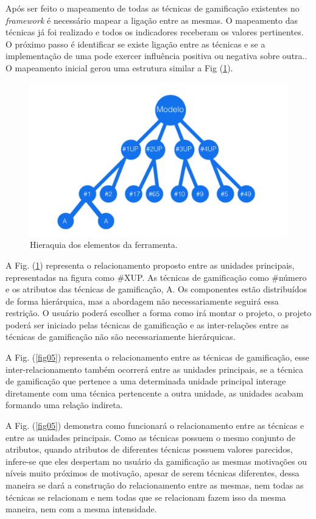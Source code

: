 Após ser feito o mapeamento de todas as técnicas de gamificação existentes no \textit{framework} é necessário mapear a ligação entre as mesmas. O mapeamento das técnicas já foi realizado e todos os indicadores receberam os valores pertinentes. O próximo passo é identificar se existe ligação entre as técnicas  e se a implementação de uma pode exercer influência positiva ou negativa sobre  outra.. O mapeamento inicial gerou uma estrutura similar a Fig (\ref{fig04}).

\begin{figure}[h]
	\centering
		\includegraphics[keepaspectratio=true,scale=0.5]{figuras/hierarquia.png}
	\caption{Hieraquia dos elementos da ferramenta.	\label{fig04}}
\end{figure}

A Fig. (\ref{fig04}) representa o relacionamento proposto entre as unidades principais, representadas na figura como \#XUP. As técnicas de gamificação como \#número e os atributos das técnicas de gamificação, A. Os componentes estão distribuídos de forma hierárquica, mas a abordagem não necessariamente seguirá essa restrição.  O usuário poderá escolher a forma como irá montar o projeto, o projeto poderá ser iniciado pelas técnicas de gamificação e as inter-relações entre as técnicas de gamificação não são necessariamente hierárquicas.

A Fig. (\ref{fig05}) representa o relacionamento entre as técnicas de gamificação, esse inter-relacionamento também ocorrerá entre as unidades principais, se a técnica de gamificação que pertence a uma determinada unidade principal interage diretamente com uma técnica pertencente a outra unidade, as unidades acabam formando uma relação indireta. 

A Fig. (\ref{fig05}) demonstra como funcionará o relacionamento entre as técnicas e entre as unidades principais. Como as técnicas possuem o mesmo conjunto de atributos, quando atributos de diferentes técnicas possuem valores parecidos, infere-se que eles despertam no usuário da gamificação as mesmas motivações ou níveis muito próximos de motivação, apesar de serem técnicas diferentes, dessa maneira se dará a construção do relacionamento entre as mesmas, nem todas as técnicas se relacionam e nem todas que se relacionam fazem isso da mesma maneira, nem com a mesma intensidade.

